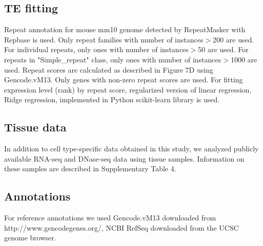 \subsection{TE fitting}
Repeat annotation for mouse mm10 genome detected by RepeatMasker \citep{repeatmasker} with Repbase \citep[ver. 20140131][]{Bao_2015} is used. Only repeat families with number of instances$>$200 are used. For individual repeats, only ones with number of instances$>$50 are used. For repeats in "Simple_repeat" class, only ones with number of instances$>$1000 are used. Repeat scores are calculated as described in Figure 7D using Gencode.vM13. Only genes with non-zero repeat scores are used. For fitting expression level (rank) by repeat score, regularized version of linear regression, Ridge regression, implemented in Python scikit-learn library \citep{scikit-learn} is used.

\subsection{Tissue data}
In addition to cell type-specific data obtained in this study, we analyzed publicly available RNA-seq and DNase-seq data using tissue samples. Information on these samples are described in Supplementary Table 4.

\subsection{Annotations}
For reference annotations we used Gencode.vM13 \citep{Harrow_2012} downloaded from http://www.gencodegenes.org/, NCBI RefSeq \citep{Pruitt_2013} downloaded from the UCSC genome browser.

